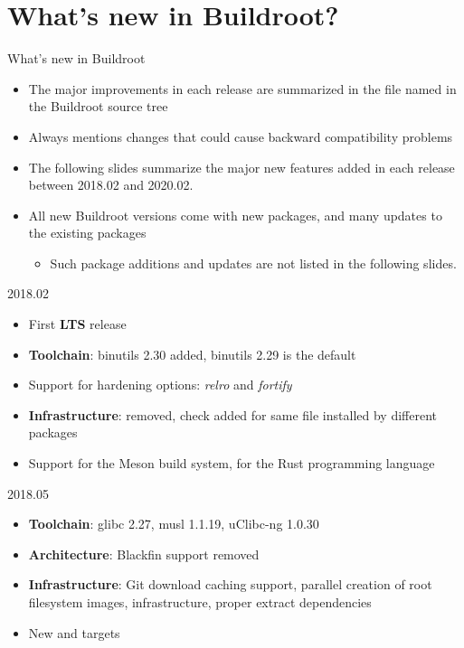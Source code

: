 \section{What's new in Buildroot?}

\begin{frame}{What's new in Buildroot}
  \begin{itemize}
  \item The major improvements in each release are summarized in the
    file named  in the Buildroot source tree
  \item Always mentions changes that could cause backward
    compatibility problems
  \item The following slides summarize the major new features added in
    each release between 2018.02 and 2020.02.
  \item All new Buildroot versions come with new packages, and many
    updates to the existing packages
    \begin{itemize}
    \item Such package additions and updates are not listed in the
      following slides.
    \end{itemize}
  \end{itemize}
\end{frame}

\begin{frame}{2018.02}
  \begin{itemize}
  \item First {\bf LTS} release
  \item {\bf Toolchain}: binutils 2.30 added, binutils 2.29 is the default
  \item Support for hardening options: {\em relro} and {\em fortify}
  \item {\bf Infrastructure}:  removed, check
    added for same file installed by different packages
  \item Support for the Meson build system, for the Rust programming
    language
  \end{itemize}
\end{frame}

\begin{frame}{2018.05}
  \begin{itemize}
  \item {\bf Toolchain}: glibc 2.27, musl 1.1.19, uClibc-ng 1.0.30
  \item {\bf Architecture}: Blackfin support removed
  \item {\bf Infrastructure}: Git download caching support, parallel
    creation of root filesystem images, 
    infrastructure, proper extract dependencies
  \item New  and
     targets
  \end{itemize}
\end{frame}

